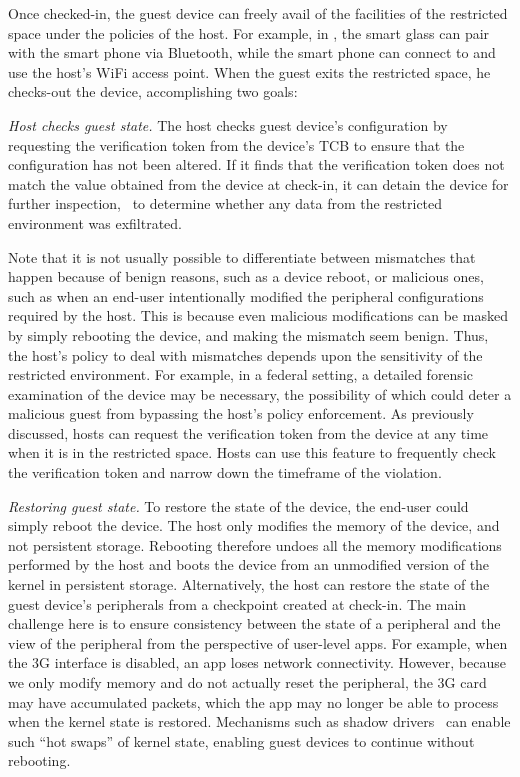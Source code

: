 Once checked-in, the guest device can freely avail of the facilities of the
restricted space under the policies of the host. For example, in
, the smart glass can pair with the smart phone
via Bluetooth, while the smart phone can connect to and use the host's WiFi
access point. When the guest exits the restricted space, he checks-out the
device, accomplishing two goals: 
%
\begin{mylist}
%
\item \textit{Host checks guest state.} The host checks guest device's
configuration by requesting the verification token from the device's TCB to
ensure that the configuration has not been altered. If it finds that the
verification token does not match the value obtained from the device at
check-in, it can detain the device for further inspection, \eg~to determine
whether any data from the restricted environment was exfiltrated.

Note that it is not usually possible to differentiate between mismatches that
happen because of benign reasons, such as a device reboot, or malicious ones,
such as when an end-user intentionally modified the peripheral configurations
required by the host. This is because even malicious modifications can be
masked by simply rebooting the device, and making the mismatch seem benign.
Thus, the host's policy to deal with mismatches depends upon the sensitivity of
the restricted environment. For example, in a federal setting, a detailed
forensic examination of the device may be necessary, the possibility of which
could deter a malicious guest from bypassing the host's policy enforcement. As
previously discussed, hosts can request the verification token from the device
at any time when it is in the restricted space. Hosts can use this feature to
frequently check the verification token and narrow down the timeframe of the
violation.

\item \textit{Restoring guest state.} To restore the state of the device, the
end-user could simply reboot the device. The host only modifies the memory of
the device, and not persistent storage. Rebooting therefore undoes all the
memory modifications performed by the host and boots the device from an
unmodified version of the kernel in persistent storage. Alternatively, the host
can restore the state of the guest device's peripherals from a checkpoint
created at check-in. The main challenge here is to ensure consistency between
the state of a peripheral and the view of the peripheral from the perspective
of user-level apps. For example, when the 3G interface is disabled, an app
loses network connectivity. However, because we only modify memory and do not
actually reset the peripheral, the 3G card may have accumulated packets, which
the app may no longer be able to process when the kernel state is restored.
Mechanisms such as shadow drivers~\cite{shadow:tocs06} can enable such ``hot
swaps'' of kernel state, enabling guest devices to continue without
rebooting.
%
\end{mylist}

